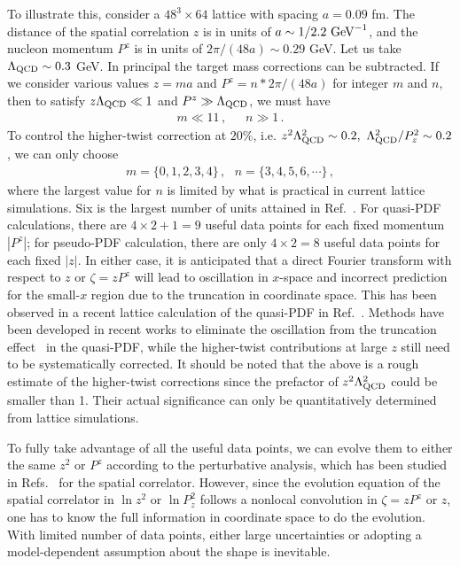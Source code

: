 \documentclass[prd,aps,twocolumn,preprintnumbers,showpacs,nofootinbib,superscriptaddress,notitlepage]{revtex4-1}
\newcommand{\beq}{\begin{eqnarray}}
\newcommand{\eeq}{\end{eqnarray}}
\newcommand{\spcorr}{spatial correlator\xspace}
\begin{document}
To illustrate this, consider a $48^3\times64$ lattice with spacing $a=0.09$ fm. The distance of the spatial correlation $z$ is in units of $a\sim1/2.2\ {\rm GeV}^{-1}$, and the nucleon momentum $P^z$ is in units of $2\pi/(48a)\sim0.29$ GeV. Let us take $\Lambda_{\rm QCD}\sim 0.3$ GeV. In principal the target mass corrections can be subtracted. If we consider various values $z=ma$ and $P^z=n*2\pi/(48a)$ for integer $m$ and $n$, then to satisfy $z\Lambda_{\rm QCD}\ll1$ and $P^z\gg \Lambda_{\rm QCD}$, we must have
\beq
 m\ll 11\,,\,\,\,\quad n\gg 1\,.
\eeq
To control the higher-twist correction at $20\%$, i.e. $z^2\Lambda_{\rm QCD}^2\sim0.2,\ \Lambda_{\rm QCD}^2/P_z^2\sim0.2$, we can only choose
\beq
m = \{0,1,2,3,4\}\,,\,\,\,\, n=\{3,4,5,6,\cdots\}\,,
\eeq
where the largest value for $n$ is limited by what is practical in current lattice simulations. Six is the largest number of units attained in Ref.~\cite{Orginos:2017kos}. For quasi-PDF calculations, there are $4\times2+1=9$ useful data points for each fixed momentum $|P^z|$; for pseudo-PDF calculation, there are only $4\times2=8$ useful data points for each fixed $|z|$. In either case, it is anticipated that a direct Fourier transform with respect to $z$ or $\zeta=zP^z$ will lead to oscillation in $x$-space and incorrect prediction for the small-$x$ region due to the truncation in coordinate space. This has been observed in a recent lattice calculation of the quasi-PDF in Ref.~\cite{Chen:2017mzz}. Methods have been developed in recent works to eliminate the oscillation from the truncation effect~\cite{Lin:2017ani,Zhang:2017gau} in the quasi-PDF, while the higher-twist contributions at large $z$ still need to be systematically corrected. It should be noted that the above is a rough estimate of the higher-twist corrections since the prefactor of $z^2\Lambda_{\rm QCD}^2$ could be smaller than 1. Their actual significance can only be quantitatively determined from lattice simulations.

To fully take advantage of all the useful data points, we can evolve them to either the same $z^2$ or $P^z$ according to the perturbative analysis, which has been studied in Refs.~\cite{Orginos:2017kos,Karpie:2017bzm,Radyushkin:2017lvu} for the \spcorr. However, since the evolution equation of the \spcorr in $\ln z^2$ or $\ln P_z^2$ follows a nonlocal convolution in $\zeta=zP^z$ or $z$, one has to know the full information in coordinate space to do the evolution. With limited number of data points, either large uncertainties or adopting a model-dependent assumption about the shape is inevitable.
\end{document}
